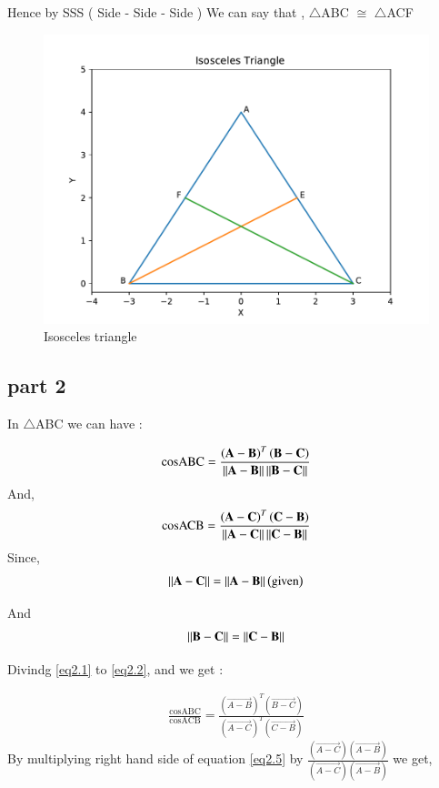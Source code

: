 \documentclass[journal,12pt,twocolumn]{IEEEtran}
\begin{document}
  Hence by SSS ( Side - Side - Side ) We can say that , $\triangle$ABC $\cong$ $\triangle$ACF  
  
  
  
  
  \begin{figure}[htb!]	
  	\centering	
  	\includegraphics[width=.50\textwidth, height=.30\textheight]{Figure_1.pdf}	
  	\caption{Isosceles triangle}
  	\label{fig1}	
  \end{figure}
  
 \subsection{part 2} 
  In $\triangle$ABC we can have :

\begin{align}
 \text{cosABC} = \frac{\left( \mathbf{A-B} \right)^T  \left( \mathbf{B - C } \right)}{\left\lVert\mathbf{A - B}\right\rVert \left\lVert\mathbf{B - C}\right\rVert} \label{eq2.1}
\end{align}
And,
\begin{align}
 \text{cosACB} = \frac{\left( \mathbf{A-C} \right)^T  \left( \mathbf{C - B } \right)}{\left\lVert\mathbf{A - C}\right\rVert \left\lVert\mathbf{C - B}\right\rVert} \label{eq2.2}
\end{align}
  Since,
   \begin{align}
  \left\lVert \mathbf{A - C}\right\rVert =  \left\lVert\mathbf{A - B}\right\rVert  \left( \text{given} \right) \label{eq2.3}
  \end{align}
  
  And
   \begin{align}
  \left\lVert \mathbf{B - C}\right\rVert =  \left\lVert\mathbf{C - B}\right\rVert  \label{eq2.4}
  \end{align}
  
 Divindg \ref{eq2.1} to \ref{eq2.2}, and we get :
 
 \begin{align}
 \frac{\text{cosABC}}{\text{cosACB}} = \frac{\left( \vec{A-B} \right)^T  \left( \vec{B - C } \right)}{\left( \vec{A-C} \right)^T  \left( \vec{C - B } \right)} \label{eq2.5}
 \end{align}
 By multiplying right hand side of equation \ref{eq2.5} by $\frac{\left( \vec{A-C} \right) \left( \vec{A - B } \right)}{\left( \vec{A-C} \right)  \left( \vec{A - B } \right)}$ we get,
 
\end{document}
